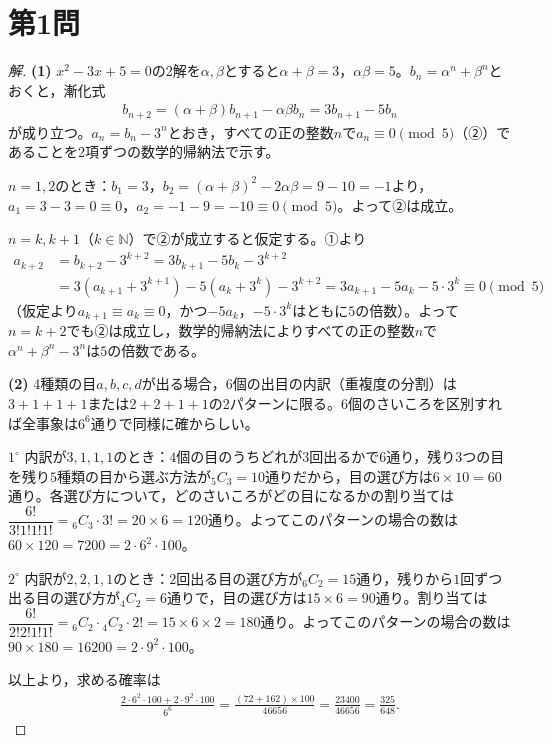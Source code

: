 \documentclass[../main.tex]{subfiles}
\begin{document}
\section*{第1問}

\begin{proof}[解]
  \textbf{(1)} $x^2-3x+5=0$の2解を$\alpha,\beta$とすると$\alpha+\beta=3$，$\alpha\beta=5$。$b_n=\alpha^n+\beta^n$とおくと，漸化式
  \begin{align*}
    b_{n+2}=(\alpha+\beta)b_{n+1}-\alpha\beta b_n=3b_{n+1}-5b_n\tag{①}
  \end{align*}
  が成り立つ。$a_n=b_n-3^n$とおき，すべての正の整数$n$で$a_n\equiv0\pmod5$（②）であることを2項ずつの数学的帰納法で示す。

  $n=1,2$のとき：$b_1=3$，$b_2=(\alpha+\beta)^2-2\alpha\beta=9-10=-1$より，$a_1=3-3=0\equiv0$，$a_2=-1-9=-10\equiv0\pmod5$。よって②は成立。

  $n=k,k+1$（$k\in\mathbb N$）で②が成立すると仮定する。①より
  \begin{align*}
    a_{k+2}&=b_{k+2}-3^{k+2}=3b_{k+1}-5b_k-3^{k+2}\\
    &=3(a_{k+1}+3^{k+1})-5(a_k+3^k)-3^{k+2}=3a_{k+1}-5a_k-5\cdot3^k\equiv0\pmod5
  \end{align*}
  （仮定より$a_{k+1}\equiv a_k\equiv0$，かつ$-5a_k$，$-5\cdot3^k$はともに$5$の倍数）。よって$n=k+2$でも②は成立し，数学的帰納法によりすべての正の整数$n$で$\alpha^n+\beta^n-3^n$は$5$の倍数である。

  \textbf{(2)} 4種類の目$a,b,c,d$が出る場合，6個の出目の内訳（重複度の分割）は$3+1+1+1$または$2+2+1+1$の2パターンに限る。6個のさいころを区別すれば全事象は$6^6$通りで同様に確からしい。

  $1^\circ$ 内訳が$3,1,1,1$のとき：$4$個の目のうちどれが$3$回出るかで$6$通り，残り$3$つの目を残り$5$種類の目から選ぶ方法が${}_5C_3=10$通りだから，目の選び方は$6\times10=60$通り。各選び方について，どのさいころがどの目になるかの割り当ては$\dfrac{6!}{3!1!1!1!}={}_6C_3\cdot3!=20\times6=120$通り。よってこのパターンの場合の数は$60\times120=7200=2\cdot6^2\cdot100$。

  $2^\circ$ 内訳が$2,2,1,1$のとき：$2$回出る目の選び方が${}_6C_2=15$通り，残りから$1$回ずつ出る目の選び方が${}_4C_2=6$通りで，目の選び方は$15\times6=90$通り。割り当ては$\dfrac{6!}{2!2!1!1!}={}_6C_2\cdot{}_4C_2\cdot2!=15\times6\times2=180$通り。よってこのパターンの場合の数は$90\times180=16200=2\cdot9^2\cdot100$。

  以上より，求める確率は
  \begin{align*}
    \frac{2\cdot6^2\cdot100+2\cdot9^2\cdot100}{6^6}=\frac{(72+162)\times100}{46656}=\frac{23400}{46656}=\frac{325}{648}.
  \end{align*}
\end{proof}
\end{document}
